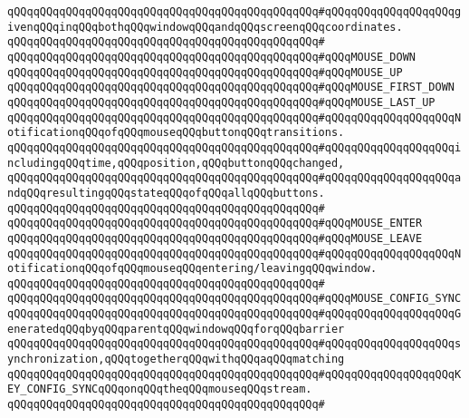 \verb|qQQqqQQqqQQqqQQqqQQqqQQqqQQqqQQqqQQqqQQqqQQqqQQq#qQQqqQQqqQQqqQQqqQQqgivenqQQqinqQQqbothqQQqwindowqQQqandqQQqscreenqQQqcoordinates.|\newline
\verb|qQQqqQQqqQQqqQQqqQQqqQQqqQQqqQQqqQQqqQQqqQQqqQQq#|\newline
\verb|qQQqqQQqqQQqqQQqqQQqqQQqqQQqqQQqqQQqqQQqqQQqqQQq#qQQqMOUSE_DOWN|\newline
\verb|qQQqqQQqqQQqqQQqqQQqqQQqqQQqqQQqqQQqqQQqqQQqqQQq#qQQqMOUSE_UP|\newline
\verb|qQQqqQQqqQQqqQQqqQQqqQQqqQQqqQQqqQQqqQQqqQQqqQQq#qQQqMOUSE_FIRST_DOWN|\newline
\verb|qQQqqQQqqQQqqQQqqQQqqQQqqQQqqQQqqQQqqQQqqQQqqQQq#qQQqMOUSE_LAST_UP|\newline
\verb|qQQqqQQqqQQqqQQqqQQqqQQqqQQqqQQqqQQqqQQqqQQqqQQq#qQQqqQQqqQQqqQQqqQQqNotificationqQQqofqQQqmouseqQQqbuttonqQQqtransitions.|\newline
\verb|qQQqqQQqqQQqqQQqqQQqqQQqqQQqqQQqqQQqqQQqqQQqqQQq#qQQqqQQqqQQqqQQqqQQqincludingqQQqtime,qQQqposition,qQQqbuttonqQQqchanged,|\newline
\verb|qQQqqQQqqQQqqQQqqQQqqQQqqQQqqQQqqQQqqQQqqQQqqQQq#qQQqqQQqqQQqqQQqqQQqandqQQqresultingqQQqstateqQQqofqQQqallqQQqbuttons.|\newline
\verb|qQQqqQQqqQQqqQQqqQQqqQQqqQQqqQQqqQQqqQQqqQQqqQQq#|\newline
\verb|qQQqqQQqqQQqqQQqqQQqqQQqqQQqqQQqqQQqqQQqqQQqqQQq#qQQqMOUSE_ENTER|\newline
\verb|qQQqqQQqqQQqqQQqqQQqqQQqqQQqqQQqqQQqqQQqqQQqqQQq#qQQqMOUSE_LEAVE|\newline
\verb|qQQqqQQqqQQqqQQqqQQqqQQqqQQqqQQqqQQqqQQqqQQqqQQq#qQQqqQQqqQQqqQQqqQQqNotificationqQQqofqQQqmouseqQQqentering/leavingqQQqwindow.|\newline
\verb|qQQqqQQqqQQqqQQqqQQqqQQqqQQqqQQqqQQqqQQqqQQqqQQq#|\newline
\verb|qQQqqQQqqQQqqQQqqQQqqQQqqQQqqQQqqQQqqQQqqQQqqQQq#qQQqMOUSE_CONFIG_SYNC|\newline
\verb|qQQqqQQqqQQqqQQqqQQqqQQqqQQqqQQqqQQqqQQqqQQqqQQq#qQQqqQQqqQQqqQQqqQQqGeneratedqQQqbyqQQqparentqQQqwindowqQQqforqQQqbarrier|\newline
\verb|qQQqqQQqqQQqqQQqqQQqqQQqqQQqqQQqqQQqqQQqqQQqqQQq#qQQqqQQqqQQqqQQqqQQqsynchronization,qQQqtogetherqQQqwithqQQqaqQQqmatching|\newline
\verb|qQQqqQQqqQQqqQQqqQQqqQQqqQQqqQQqqQQqqQQqqQQqqQQq#qQQqqQQqqQQqqQQqqQQqKEY_CONFIG_SYNCqQQqonqQQqtheqQQqmouseqQQqstream.|\newline
\verb|qQQqqQQqqQQqqQQqqQQqqQQqqQQqqQQqqQQqqQQqqQQqqQQq#|\newline
